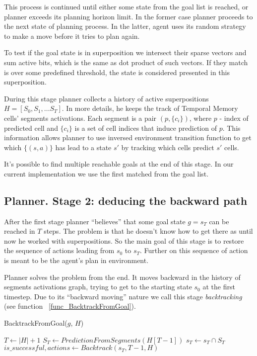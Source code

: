 \documentclass[runningheads]{llncs}
\begin{document}
This process is continued until either some state from the goal list is reached, or planner exceeds its planning horizon limit. In the former case planner proceeds to the next state of planning process. In the latter, agent uses its random strategy to make a move before it tries to plan again.

To test if the goal state is in superposition we intersect their sparse vectors and sum active bits, which is the same as dot product of such vectors. If they match is over some predefined threshold, the state is considered presented in this superposition.

During this stage planner collects a history of active superpositions $H = [S_0, S_1, \dots S_T]$. In more details, he keeps the track of Temporal Memory cells' segments activations. Each segment is a pair $(p, \{c_i\})$, where $p$ - index of predicted cell and $\{c_i\}$ is a set of cell indices that induce prediction of $p$. This information allows planner to use inversed environment transition function to get which $\{(s, a)\}$ has lead to a state $s'$ by tracking which cells predict $s'$ cells.

It's possible to find multiple reachable goals at the end of this stage. In our current implementation we use the first matched from the goal list.

\subsection{Planner. Stage 2: deducing the backward path}

After the first stage planner ``believes'' that some goal state $g = s_T$ can be reached in $T$ steps. The problem is that he doesn't know how to get there as until now he worked with superpositions. So the main goal of this stage is to restore the sequence of actions leading from $s_0$ to $s_T$. Further on this sequence of action is meant to be the agent's plan in environment.

Planner solves the problem from the end. It moves backward in the history of segments activations graph, trying to get to the starting state $s_0$ at the first timestep. Due to its ``backward moving'' nature we call this stage \textit{backtracking} (see function ~\ref{func_BacktrackFromGoal}).

\begin{function}
  \caption{BacktrackFromGoal($g$, $H$)} \label{func_BacktrackFromGoal}

  $T \leftarrow |H| + 1$ 
  $S_T \leftarrow PredictionFromSegments(H[T-1])$ 
  $s_T \leftarrow s_T \cap S_T$ 
  \quad \\
  $is\_successful, actions \leftarrow Backtrack(s_T, T-1, H)$ \;
\end{function}
\end{document}
